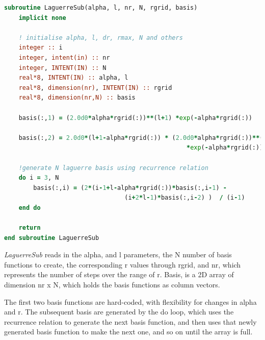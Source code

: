 \documentclass{article}
\begin{document}
\begin{lstlisting}[language=Fortran]
subroutine LaguerreSub(alpha, l, nr, N, rgrid, basis)
	implicit none
	
	! initialise alpha, l, dr, rmax, N and others
	integer :: i
	integer, intent(in) :: nr
	integer, INTENT(IN) :: N
	real*8, INTENT(IN) :: alpha, l
	real*8, dimension(nr), INTENT(IN) :: rgrid
	real*8, dimension(nr,N) :: basis
	
	basis(:,1) = (2.0d0*alpha*rgrid(:))**(l+1) *exp(-alpha*rgrid(:))
	
	basis(:,2) = 2.0d0*(l+1-alpha*rgrid(:)) * (2.0d0*alpha*rgrid(:))**(l+1) 
	                                              *exp(-alpha*rgrid(:))
	
	!generate N laguerre basis using recurrence relation
	do i = 3, N
		basis(:,i) = (2*(i-1+l-alpha*rgrid(:))*basis(:,i-1) - 
		                         (i+2*l-1)*basis(:,i-2) )  / (i-1)
	end do
	
	return
end subroutine LaguerreSub
\end{lstlisting}

    \textit{LaguerreSub} reads in the alpha, and l parameters, the N number of basis functions to create, the corresponding r values through rgrid, and nr, which represents the number of steps over the range of r. Basis, is a 2D array of dimension nr x N, which holds the basis functions as column vectors.
    
    The first two basis functions are hard-coded, with flexibility for changes in alpha and r. The subsequent basis are generated by the do loop, which uses the recurrence relation to generate the next basis function, and then uses that newly generated basis function to make the next one, and so on until the array is full. 
    
\end{document}
